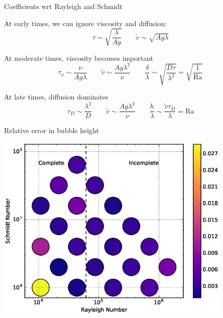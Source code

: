 \documentclass[12pt]{beamer}
\begin{document}
\begin{frame}[t]{Coefficients wrt Rayleigh and Schmidt}

At early times, we can ignore viscosity and diffusion:
\begin{equation*}
\tau \sim \sqrt{\frac{\lambda}{A g}} \qquad \tilde{v} \sim \sqrt{A g \lambda}
\end{equation*}

At moderate times, viscosity becomes important
\begin{equation*}
\tau_\nu \sim \frac{\nu}{A g \lambda} \qquad \tilde{v} \sim \frac{A g \lambda^2}{\nu} \qquad \frac{\delta}{\lambda} \sim \sqrt{\frac{D \tau}{\lambda^2}} = \sqrt{\frac{1}{\text{Ra}}}
\end{equation*}

At late times, diffusion dominates
\begin{equation*}
\tau_D \sim \frac{\lambda^2}{D} \qquad \tilde{v} \sim \frac{A g \lambda^2}{\nu} \qquad \frac{h}{\lambda} \sim \frac{\tilde{v} \tau_D}{\lambda} = \text{Ra}
\end{equation*}
\end{frame}

\begin{frame}[t]{Relative error in bubble height}
\begin{center}
\vspace{-11pt}
\includegraphics[width=0.85\textwidth]{graphics/DynamicsError-vs-Rayleigh-Schmidt.eps}
\end{center}
\end{frame}
\end{document}
